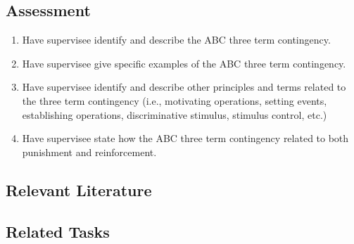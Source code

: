 \subsection{Assessment}
\begin{enumerate}
\item Have supervisee identify and describe the ABC three term contingency.
\item Have supervisee give specific examples of the ABC three term contingency.
\item Have supervisee identify and describe other principles and terms related to the three term contingency (i.e., motivating operations, setting events, establishing operations, discriminative stimulus, stimulus control, etc.)
\item Have supervisee state how the ABC three term contingency related to both punishment and reinforcement.
\end{enumerate}
%
\subsection{Relevant Literature}
\begin{refsection}
\nocite{azrin1966punishment,
        cooper2007applied,
        glenn1992revolutionary,
        michael2004concepts,
        moxley2004pragmatic,
        sulzer1977applying,
        vollmer2002punishment,
        vollmer1991establishing}
\printbibliography[heading=none]
\end{refsection}
%
\subsection{Related Tasks}
\fourbOne{}\\
\foureOne{}\\
\fourgFour{}\\
\fouriOne{}\\
\fouriTwo{}\\
\fourFKTen{}\\
\fourFKEleven{}\\
\fourFKFifteen{}\\
\fourFKTwentyOne{}\\
\fourFKTwentySeven{}\\
\fourFKThirty{}\\
\fourFKThirtyThree{}\\
\fourFKThirtyFour{}\\
\fourFKThirtyFive{}\\
\fourFKFourtyOne{}\\
